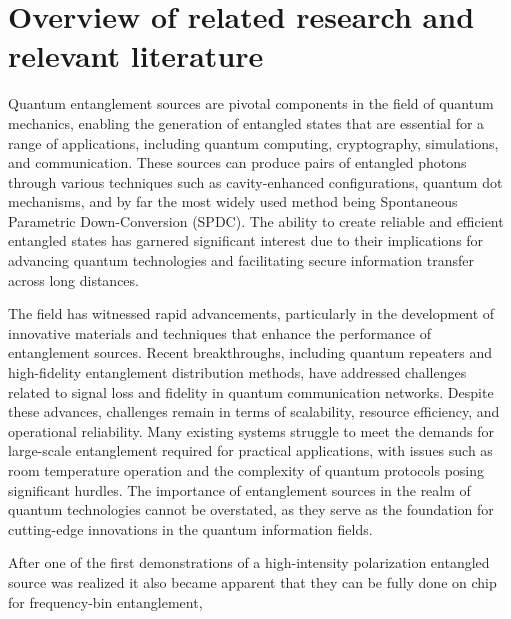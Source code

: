 \documentclass{article}
\theoremstyle{mytheoremstyle}
\theoremstyle{mytheoremstyle}
\theoremstyle{myproblemstyle}
\begin{document}
\section{Overview of related research and relevant literature}
Quantum entanglement sources are pivotal components in the field of quantum mechanics, enabling the generation of entangled states
that are essential for a range of applications, including quantum computing, cryptography, simulations, and communication.
These sources can produce pairs of entangled photons through various techniques such as cavity-enhanced configurations,
quantum dot mechanisms, and by far the most widely used method being Spontaneous Parametric Down-Conversion (SPDC).
The ability to create reliable and efficient entangled states has garnered significant interest due to their 
implications for advancing quantum technologies and facilitating secure information transfer across long distances.
\par The field has witnessed rapid advancements, particularly in the development of innovative materials and techniques that enhance the
performance of entanglement sources. Recent breakthroughs, including quantum repeaters and high-fidelity entanglement distribution methods,
have addressed challenges related to signal loss and fidelity in quantum communication networks.
Despite these advances, challenges remain in terms of scalability, resource efficiency, and operational reliability.
Many existing systems struggle to meet the demands for large-scale entanglement required for practical applications,
with issues such as room temperature operation and the complexity of quantum protocols posing significant hurdles.
The importance of entanglement sources in the realm of quantum technologies cannot be overstated,
as they serve as the foundation for cutting-edge innovations in the quantum information fields.
\par After one of the first \cite{Kwiat_1995} demonstrations of a high-intensity polarization entangled source was realized it also
became apparent that they can be fully done on chip \cite{S_G_S_C_F_B_L_G_B_2022} for frequency-bin entanglement,
\end{document}
